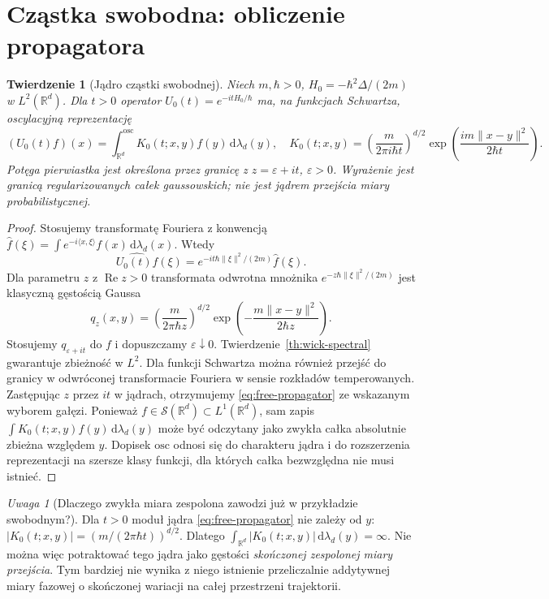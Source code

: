 \documentclass[11pt,a4paper,oneside]{report}
\numberwithin{equation}{chapter}
\theoremstyle{plain}
\newtheorem{twierdzenie}{Twierdzenie}[chapter]
\theoremstyle{definition}
\theoremstyle{remark}
\newtheorem{uwaga}{Uwaga}[chapter]
\newcommand{\R}{\mathbb{R}}
\newcommand{\calS}{\mathcal{S}}
\newcommand{\dd}{\mathrm{d}}
\begin{document}
\section{Cząstka swobodna: obliczenie propagatora}

\begin{twierdzenie}[Jądro cząstki swobodnej]
\label{th:free-schrodinger-kernel}
Niech $m,\hbar>0$, $H_0=-\hbar^2\Delta/(2m)$ w
$L^2(\R^d)$. Dla $t>0$ operator
$U_0(t)=e^{-itH_0/\hbar}$ ma, na funkcjach Schwartza,
oscylacyjną reprezentację
\[
 (U_0(t)f)(x)=\int_{\R^d}^{\mathrm{osc}}
 K_0(t;x,y)f(y)\,\dd\lambda_d(y),
\quad
 K_0(t;x,y)=\left(\frac{m}{2\pi i\hbar t}\right)^{d/2}
 \exp\left(\frac{im\|x-y\|^2}{2\hbar t}\right).
\tag{16.6}\label{eq:free-propagator}
\]
Potęga pierwiastka jest określona przez granicę z
$z=\varepsilon+it$, $\varepsilon>0$. Wyrażenie jest
granicą regularizowanych całek gaussowskich; nie jest
jądrem przejścia miary probabilistycznej.
\end{twierdzenie}
\begin{proof}
Stosujemy transformatę Fouriera z konwencją
$\widehat f(\xi)=\int e^{-i\langle x,\xi\rangle}
 f(x)\,\dd\lambda_d(x)$. Wtedy
\[
 \widehat{U_0(t)f}(\xi)
 =e^{-it\hbar\|\xi\|^2/(2m)}\widehat f(\xi).
\]
Dla parametru $z$ z $\operatorname{Re}z>0$
transformata odwrotna mnożnika
$e^{-z\hbar\|\xi\|^2/(2m)}$ jest klasyczną gęstością
Gaussa
\[
 q_z(x,y)=\left(\frac{m}{2\pi\hbar z}\right)^{d/2}
 \exp\left(-\frac{m\|x-y\|^2}{2\hbar z}\right).
\]
Stosujemy $q_{\varepsilon+it}$ do $f$ i dopuszczamy
$\varepsilon\downarrow0$. Twierdzenie~\ref{th:wick-spectral}
gwarantuje zbieżność w $L^2$. Dla funkcji Schwartza
można również przejść do granicy w odwróconej
transformacie Fouriera w sensie rozkładów temperowanych.
Zastępując $z$ przez $it$ w jądrach, otrzymujemy
\eqref{eq:free-propagator} ze wskazanym wyborem gałęzi.
Ponieważ $f\in\calS(\R^d)\subset L^1(\R^d)$,
sam zapis $\int K_0(t;x,y)f(y)\,\dd\lambda_d(y)$
może być odczytany jako zwykła całka absolutnie zbieżna
względem $y$. Dopisek $\mathrm{osc}$ odnosi się do
charakteru jądra i do rozszerzenia reprezentacji na
szersze klasy funkcji, dla których całka bezwzględna
nie musi istnieć.
\end{proof}

\begin{uwaga}[Dlaczego zwykła miara zespolona zawodzi już w przykładzie swobodnym?]
Dla $t>0$ moduł jądra \eqref{eq:free-propagator}
nie zależy od $y$:
$|K_0(t;x,y)|=(m/(2\pi\hbar t))^{d/2}$.
Dlatego $\int_{\R^d}|K_0(t;x,y)|\,\dd\lambda_d(y)=\infty$.
Nie można więc potraktować tego jądra jako gęstości
\emph{skończonej zespolonej miary przejścia}.
Tym bardziej nie wynika z niego istnienie przeliczalnie
addytywnej miary fazowej o skończonej wariacji na
całej przestrzeni trajektorii.
\end{uwaga}
\end{document}
